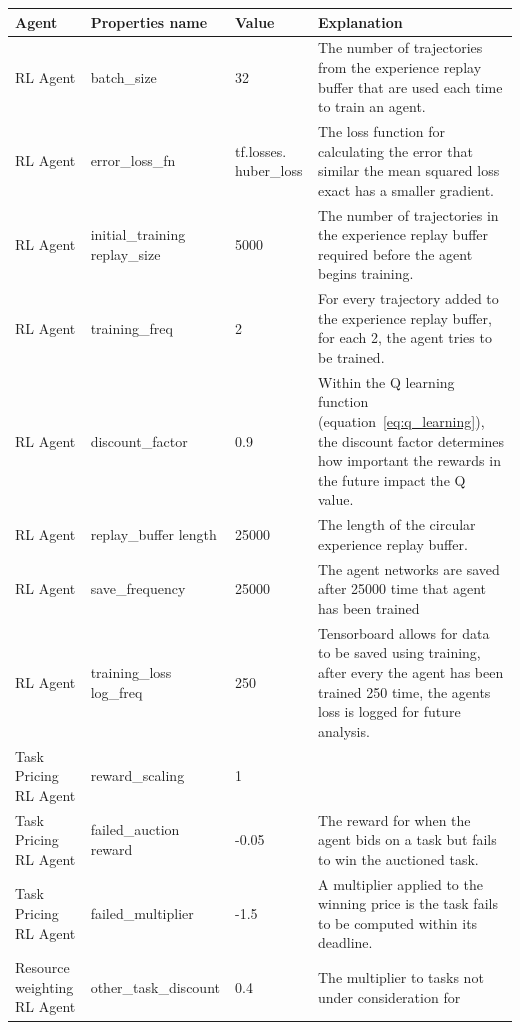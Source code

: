 \begin{longtable}{|p{2cm}|p{3.5cm}|p{2.5cm}|p{6cm}|} \hline
    \textbf{Agent} & \textbf{Properties name} & \textbf{Value} & \textbf{Explanation} \\ \hline
        RL Agent & batch\_size & 32 & The number of trajectories from the experience replay buffer that are used each
            time to train an agent. \\ \hline
        RL Agent & error\_loss\_fn & tf.losses. huber\_loss & The loss function for calculating the error that similar
            the mean squared loss exact has a smaller gradient. \\ \hline
        RL Agent & initial\_training replay\_size & 5000 & The number of trajectories in the experience replay buffer
            required before the agent begins training. \\ \hline
        RL Agent & training\_freq & 2 & For every trajectory added to the experience replay buffer, for each 2, the
            agent tries to be trained. \\ \hline
        RL Agent & discount\_factor & 0.9 & Within the Q learning function (equation~\eqref{eq:q_learning}), the
            discount factor determines how important the rewards in the future impact the Q value. \\ \hline
        RL Agent & replay\_buffer length & 25000 & The length of the circular experience replay buffer. \\ \hline
        RL Agent & save\_frequency & 25000 & The agent networks are saved after 25000 time that agent has been trained
            \\ \hline
        RL Agent & training\_loss log\_freq & 250 & Tensorboard allows for data to be saved using training, after every
            the agent has been trained 250 time, the agents loss is logged for future analysis. \\ \hline
        Task Pricing RL Agent & reward\_scaling & 1 & \\ \hline
        Task Pricing RL Agent & failed\_auction reward & -0.05 & The reward for when the agent bids on a task but fails
            to win the auctioned task. \\ \hline
        Task Pricing RL Agent & failed\_multiplier & -1.5 & A multiplier applied to the winning price is the task fails
            to be computed within its deadline. \\ \hline
        Resource weighting RL Agent & other\_task\_discount & 0.4 & The multiplier to tasks not under consideration for

\end{longtable}

